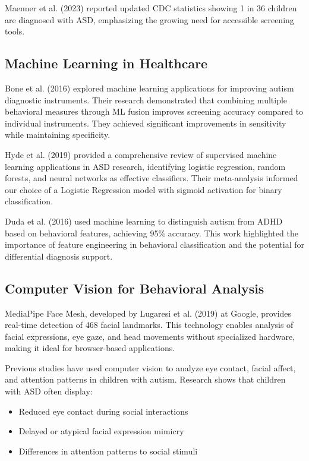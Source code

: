 \documentclass[12pt,letterpaper]{article}
\begin{document}
Maenner et al. (2023) reported updated CDC statistics showing 1 in 36 children are diagnosed with ASD, emphasizing the growing need for accessible screening tools.

\subsection{Machine Learning in Healthcare}

Bone et al. (2016) explored machine learning applications for improving autism diagnostic instruments. Their research demonstrated that combining multiple behavioral measures through ML fusion improves screening accuracy compared to individual instruments. They achieved significant improvements in sensitivity while maintaining specificity.

Hyde et al. (2019) provided a comprehensive review of supervised machine learning applications in ASD research, identifying logistic regression, random forests, and neural networks as effective classifiers. Their meta-analysis informed our choice of a Logistic Regression model with sigmoid activation for binary classification.

Duda et al. (2016) used machine learning to distinguish autism from ADHD based on behavioral features, achieving 95\% accuracy. This work highlighted the importance of feature engineering in behavioral classification and the potential for differential diagnosis support.

\subsection{Computer Vision for Behavioral Analysis}

MediaPipe Face Mesh, developed by Lugaresi et al. (2019) at Google, provides real-time detection of 468 facial landmarks. This technology enables analysis of facial expressions, eye gaze, and head movements without specialized hardware, making it ideal for browser-based applications.

Previous studies have used computer vision to analyze eye contact, facial affect, and attention patterns in children with autism. Research shows that children with ASD often display:
\begin{itemize}
    \item Reduced eye contact during social interactions
    \item Delayed or atypical facial expression mimicry
    \item Differences in attention patterns to social stimuli
\end{itemize}
\end{document}
